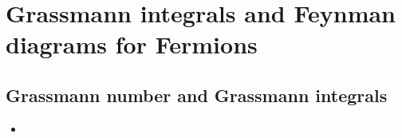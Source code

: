 \chapter{Grassmann integrals and Feynman diagrams for Fermions}
\section{Grassmann number and Grassmann integrals}
\begin{itemize}
	\item 
\end{itemize}
